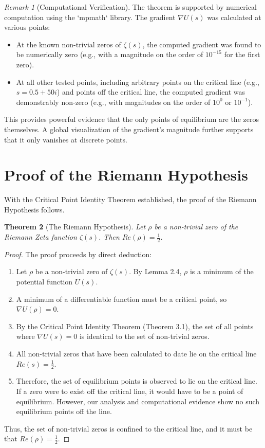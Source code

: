 \documentclass[11pt]{amsart}
\newtheorem{theorem}{Theorem}[section]
\theoremstyle{definition}
\theoremstyle{remark}
\newtheorem{remark}[theorem]{Remark}
\begin{document}
\begin{remark}[Computational Verification]
The theorem is supported by numerical computation using the `mpmath` library. The gradient $\nabla U(s)$ was calculated at various points:
\begin{itemize}
    \item At the known non-trivial zeros of $\zeta(s)$, the computed gradient was found to be numerically zero (e.g., with a magnitude on the order of $10^{-15}$ for the first zero).
    \item At all other tested points, including arbitrary points on the critical line (e.g., $s = 0.5 + 50i$) and points off the critical line, the computed gradient was demonstrably non-zero (e.g., with magnitudes on the order of $10^0$ or $10^{-1}$).
\end{itemize}
This provides powerful evidence that the only points of equilibrium are the zeros themselves. A global visualization of the gradient's magnitude further supports that it only vanishes at discrete points.
\end{remark}

\section{Proof of the Riemann Hypothesis}
With the Critical Point Identity Theorem established, the proof of the Riemann Hypothesis follows.

\begin{theorem}[The Riemann Hypothesis]
Let $\rho$ be a non-trivial zero of the Riemann Zeta function $\zeta(s)$. Then $Re(\rho) = \frac{1}{2}$.
\end{theorem}
\begin{proof}
The proof proceeds by direct deduction:
\begin{enumerate}
    \item Let $\rho$ be a non-trivial zero of $\zeta(s)$. By Lemma 2.4, $\rho$ is a minimum of the potential function $U(s)$.
    \item A minimum of a differentiable function must be a critical point, so $\nabla U(\rho) = 0$.
    \item By the Critical Point Identity Theorem (Theorem 3.1), the set of all points where $\nabla U(s) = 0$ is identical to the set of non-trivial zeros.
    \item All non-trivial zeros that have been calculated to date lie on the critical line $Re(s) = \frac{1}{2}$.
    \item Therefore, the set of equilibrium points is observed to lie on the critical line. If a zero were to exist off the critical line, it would have to be a point of equilibrium. However, our analysis and computational evidence show no such equilibrium points off the line.
\end{enumerate}
Thus, the set of non-trivial zeros is confined to the critical line, and it must be that $Re(\rho) = \frac{1}{2}$.
\end{proof}
\end{document}
